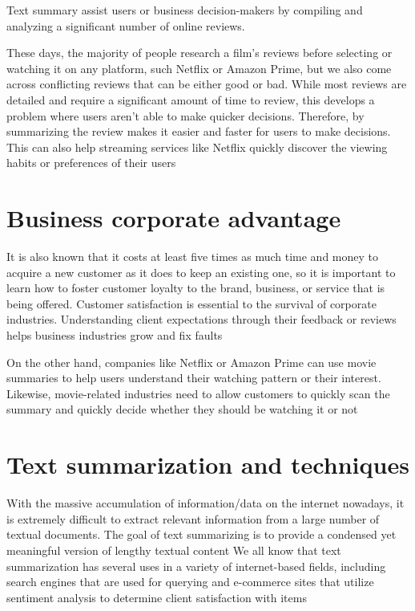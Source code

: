 \documentclass[manuscript,screen,natbib=false]{acmart}
\begin{document}
Text summary assist users or business decision-makers by compiling and analyzing a significant number of online reviews. \cite{alsaqer_sasi_2017}

These days, the majority of people research a film's reviews before selecting or watching it on any platform, such Netflix or Amazon Prime, but we also come across conflicting reviews that can be either good or bad. While most reviews are detailed and require a significant amount of time to review, this develops a problem where users aren't able to make quicker decisions. Therefore, by summarizing the review makes it easier and faster for users to make decisions. This can also help streaming services like Netflix quickly discover the viewing habits or preferences of their users \cite{dashtipour_gogate_adeel_larijani_hussain_2021}

\section{Business corporate advantage}
It is also known that it costs at least five times as much time and money to acquire a new customer as it does to keep an existing one, so it is important to learn how to foster customer loyalty to the brand, business, or service that is being offered. Customer satisfaction is essential to the survival of corporate industries. Understanding client expectations through their feedback or reviews helps business industries grow and fix faults \cite{pizam_ellis_1999}

On the other hand, companies like Netflix or Amazon Prime can use movie summaries to help users understand their watching pattern or their interest. Likewise, movie-related industries need to allow customers to quickly scan the summary and quickly decide whether they should be watching it or not \cite{khan_gul_zareei_biswal_zeb_naeem_saeed_salim_2020}

\section{Text summarization and techniques}
With the massive accumulation of information/data on the internet nowadays, it is extremely difficult to extract relevant information from a large number of textual documents. The goal of text summarizing is to provide a condensed yet meaningful version of lengthy textual content \cite{shi_keneshloo_ramakrishnan_reddy_2020}
We all know that text summarization has several uses in a variety of internet-based fields, including search engines that are used for querying and e-commerce sites that utilize sentiment analysis to determine client satisfaction with items \cite{etemad_abidi_chhabra_2021}
\end{document}
